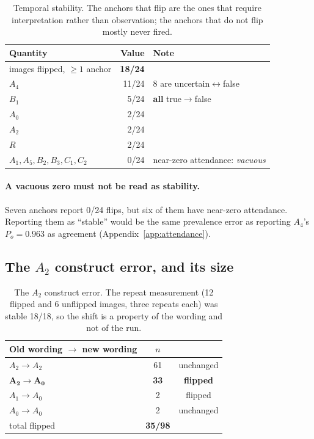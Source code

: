 \begin{table}[H]
\centering\small
\begin{tabularx}{\linewidth}{@{}lrX@{}}
\toprule
Quantity & Value & Note \\
\midrule
images flipped, $\ge1$ anchor & \textbf{18/24} & \\
$A_4$ & 11/24 & 8 are uncertain$\leftrightarrow$false \\
$B_1$ & 5/24 & \textbf{all} true$\to$false \\
$A_0$ & 2/24 & \\
$A_2$ & 2/24 & \\
$R$ & 2/24 & \\
$A_1,A_5,B_2,B_3,C_1,C_2$ & 0/24 & near-zero attendance: \emph{vacuous} \\
\bottomrule
\end{tabularx}
\caption{Temporal stability. The anchors that flip are the ones that require
interpretation rather than observation; the anchors that do not flip mostly
never fired.}
\label{tab:temporal}
\end{table}

\paragraph{A vacuous zero must not be read as stability.} Seven anchors report
0/24 flips, but six of them have near-zero attendance. Reporting them as
``stable'' would be the same prevalence error as reporting $A_4$'s $P_o=0.963$
as agreement (Appendix~\ref{app:attendance}).

\subsection{The $A_2$ construct error, and its size}

\begin{table}[H]
\centering\small
\begin{tabular}{@{}lcc@{}}
\toprule
Old wording $\to$ new wording & $n$ & \\
\midrule
$A_2\to A_2$ & 61 & unchanged \\
$\boldsymbol{A_2\to A_0}$ & \textbf{33} & \textbf{flipped} \\
$A_1\to A_0$ & 2 & flipped \\
$A_0\to A_0$ & 2 & unchanged \\
\midrule
total flipped & \textbf{35/98} & \\
\bottomrule
\end{tabular}
\caption{The $A_2$ construct error. The repeat measurement (12 flipped and 6
unflipped images, three repeats each) was stable 18/18, so the shift is a
property of the wording and not of the run.}
\label{tab:wardrobe}
\end{table}

